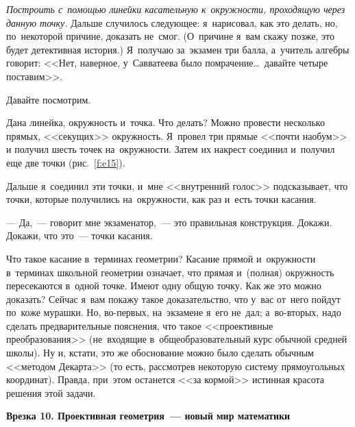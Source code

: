 \textit{Построить с~помощью линейки касательную к~окружности, проходящую через данную точку.} Дальше
случилось следующее: я~нарисовал, как это делать, но, по~некоторой причине, доказать не~смог.
(О~причине я~вам скажу позже, это будет детективная история.) Я~получаю за~экзамен три балла,
а~учитель алгебры говорит: <<Нет, наверное, у~Савватеева было помрачение\ldots\ давайте четыре
поставим>>.

Давайте посмотрим.

Дана линейка, окружность и~точка. Что делать? Можно провести несколько прямых, <<секущих>> окружность. Я~провел три прямые
<<почти наобум>> и получил шесть точек на~окружности.
 Затем их накрест соединил и~получил еще две
точки (рис.~\ref{f:e15}).


Дальше я~соединил эти точки, и~мне <<внутренний голос>> подсказывает, что точки, которые получились
на~окружности, как раз и~есть точки касания.


--- Да,~--- говорит мне экзаменатор,~--- это правильная конструкция. Докажи. Докажи, что это~--- точки
касания.

Что такое касание в~терминах геометрии? Касание прямой и~окружности в~терминах школьной геометрии
означает, что прямая и~(полная) окружность пересекаются в~одной точке. Имеют одну общую точку. Как
же это можно доказать? Сейчас я~вам покажу такое доказательство, что у~вас от~него пойдут по~коже
мурашки. Но, во-первых, на~экзамене я~его не~дал; а~во-вторых, надо сделать предварительные
пояснения, что такое <<проективные преобразования>> (не~входящие в~общеобразовательный курс обычной
средней школы). Ну и, кстати, это же обоснование можно было сделать обычным <<методом Декарта>> (то
есть, рассмотрев некоторую систему прямоугольных координат). Правда, при~этом останется <<за
кормой>> истинная красота решения этой задачи.

\medskip

\hrulefill

\smallskip

\textbf{Врезка 10. Проективная геометрия~--- новый мир математики}

